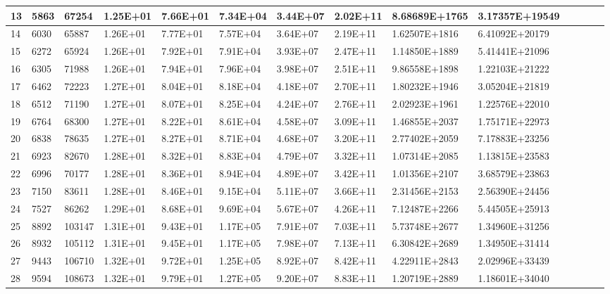 \documentclass{article}
\begin{document}
\begin{itemize}
\begin{table}[H]
{\begin{tabular}{|l|l|l|l|l|l|l|l|l|l|l|l|l|l|}
    \hline
    13    & 5863  & 67254 & 1.25E+01 & 7.66E+01 & 7.34E+04 & 3.44E+07 & 2.02E+11 & 8.68689E+1765 & 3.17357E+19549 \\
    \hline
    14    & 6030  & 65887 & 1.26E+01 & 7.77E+01 & 7.57E+04 & 3.64E+07 & 2.19E+11 & 1.62507E+1816 & 6.41092E+20179 \\
    \hline
    15    & 6272  & 65924 & 1.26E+01 & 7.92E+01 & 7.91E+04 & 3.93E+07 & 2.47E+11 & 1.14850E+1889 & 5.41441E+21096 \\
    \hline
    16    & 6305  & 71988 & 1.26E+01 & 7.94E+01 & 7.96E+04 & 3.98E+07 & 2.51E+11 & 9.86558E+1898 & 1.22103E+21222 \\
    \hline
    17    & 6462  & 72223 & 1.27E+01 & 8.04E+01 & 8.18E+04 & 4.18E+07 & 2.70E+11 & 1.80232E+1946 & 3.05204E+21819 \\
    \hline
    18    & 6512  & 71190 & 1.27E+01 & 8.07E+01 & 8.25E+04 & 4.24E+07 & 2.76E+11 & 2.02923E+1961 & 1.22576E+22010 \\
    \hline
    19    & 6764  & 68300 & 1.27E+01 & 8.22E+01 & 8.61E+04 & 4.58E+07 & 3.09E+11 & 1.46855E+2037 & 1.75171E+22973 \\
    \hline
    20    & 6838  & 78635 & 1.27E+01 & 8.27E+01 & 8.71E+04 & 4.68E+07 & 3.20E+11 & 2.77402E+2059 & 7.17883E+23256 \\
    \hline
    21    & 6923  & 82670 & 1.28E+01 & 8.32E+01 & 8.83E+04 & 4.79E+07 & 3.32E+11 & 1.07314E+2085 & 1.13815E+23583 \\
    \hline
    22    & 6996  & 70177 & 1.28E+01 & 8.36E+01 & 8.94E+04 & 4.89E+07 & 3.42E+11 & 1.01356E+2107 & 3.68579E+23863 \\
    \hline
    23    & 7150  & 83611 & 1.28E+01 & 8.46E+01 & 9.15E+04 & 5.11E+07 & 3.66E+11 & 2.31456E+2153 & 2.56390E+24456 \\
    \hline
    24    & 7527  & 86262 & 1.29E+01 & 8.68E+01 & 9.69E+04 & 5.67E+07 & 4.26E+11 & 7.12487E+2266 & 5.44505E+25913 \\
    \hline
    25    & 8892  & 103147 & 1.31E+01 & 9.43E+01 & 1.17E+05 & 7.91E+07 & 7.03E+11 & 5.73748E+2677 & 1.34960E+31256 \\
    \hline
    26    & 8932  & 105112 & 1.31E+01 & 9.45E+01 & 1.17E+05 & 7.98E+07 & 7.13E+11 & 6.30842E+2689 & 1.34950E+31414 \\
    \hline
    27    & 9443  & 106710 & 1.32E+01 & 9.72E+01 & 1.25E+05 & 8.92E+07 & 8.42E+11 & 4.22911E+2843 & 2.02996E+33439 \\
    \hline
    28    & 9594  & 108673 & 1.32E+01 & 9.79E+01 & 1.27E+05 & 9.20E+07 & 8.83E+11 & 1.20719E+2889 & 1.18601E+34040 \\

\end{tabular}}
\end{table}
\end{itemize}
\end{document}
